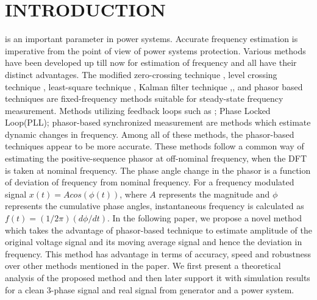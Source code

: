 \section{INTRODUCTION}
 is an important parameter in power systems. Accurate frequency estimation is imperative from the point of view of power systems protection. Various methods have been developed up till now for estimation of frequency and all have their distinct advantages. The modified zero-crossing technique \cite{modzcd}, level crossing technique \cite{levelcross}, least-square technique \cite{leastsquare}, Kalman filter technique \cite{kalman1},\cite{kalman2}, and phasor based techniques \cite{leakeffect,phasor1,lovell,synchro,phadkebook} are fixed-frequency methods suitable for steady-state frequency measurement. Methods utilizing feedback loops such as \cite{phasecontrol}; Phase Locked Loop(PLL); phasor-based synchronized measurement \cite{synchro} are methods which estimate dynamic changes in frequency. 
Among all of these methods, the phasor-based techniques appear to be more accurate. These methods follow a common way of estimating the positive-sequence phasor at off-nominal frequency, when the DFT is taken at nominal frequency. The phase angle change in the phasor is a function of deviation of frequency from nominal frequency. For a frequency modulated signal $x(t)=Acos(\phi(t))$, where $A$ represents the magnitude and $\phi$ represents the cumulative phase angles, instantaneous frequency is calculated as $f(t) = (1/2\pi)(d\phi /dt)$.
In the following paper, we propose a novel method which takes the advantage of phasor-based technique to estimate amplitude of the original voltage signal and its moving average signal and hence the deviation in frequency. This method has advantage in terms of accuracy, speed and robustness over other methods mentioned in the paper. We first present a theoretical analysis of the proposed method and then later support it with simulation results for a clean 3-phase signal and real signal from generator and a power system.